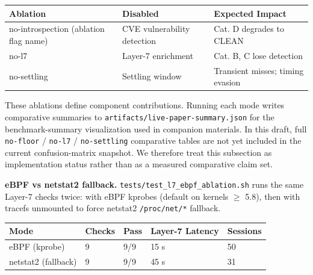 \documentclass[
]{article}
\newcounter{none} %
\begin{document}
{\def\LTcaptype{none} %
\begin{longtable}[]{@{}
  >{\raggedright\arraybackslash}p{}
  >{\raggedright\arraybackslash}p{}
  >{\raggedright\arraybackslash}p{}@{}}
\toprule\noalign{}
\begin{minipage}[b]{\linewidth}\raggedright
Ablation
\end{minipage} & \begin{minipage}[b]{\linewidth}\raggedright
Disabled
\end{minipage} & \begin{minipage}[b]{\linewidth}\raggedright
Expected Impact
\end{minipage} \\
\midrule\noalign{}
\endhead
\bottomrule\noalign{}
\endlastfoot
no-introspection (ablation flag name) & CVE vulnerability detection &
Cat. D degrades to CLEAN \\
no-l7 & Layer-7 enrichment & Cat. B, C lose detection \\
no-settling & Settling window & Transient misses; timing evasion \\
\end{longtable}
}

These ablations define component contributions. Running each mode writes
comparative summaries to \texttt{artifacts/live-paper-summary.json} for
the benchmark-summary visualization used in companion materials. In this
draft, full \texttt{no-floor} / \texttt{no-l7} / \texttt{no-settling}
comparative tables are not yet included in the current confusion-matrix
snapshot. We therefore treat this subsection as implementation status
rather than as a measured comparative claim set.

\textbf{eBPF vs netstat2 fallback.}
\texttt{tests/test\_l7\_ebpf\_ablation.sh} runs the same Layer-7 checks
twice: with eBPF kprobes (default on kernels \(\geq\) 5.8), then with
tracefs unmounted to force netstat2 \texttt{/proc/net/*} fallback.

{\def\LTcaptype{none} %
\begin{longtable}[]{@{}lllll@{}}
\toprule\noalign{}
Mode & Checks & Pass & Layer-7 Latency & Sessions \\
\midrule\noalign{}
\endhead
\bottomrule\noalign{}
\endlastfoot
eBPF (kprobe) & 9 & 9/9 & 15 s & 50 \\
netstat2 (fallback) & 9 & 9/9 & 45 s & 31 \\
\end{longtable}
}
\end{document}
